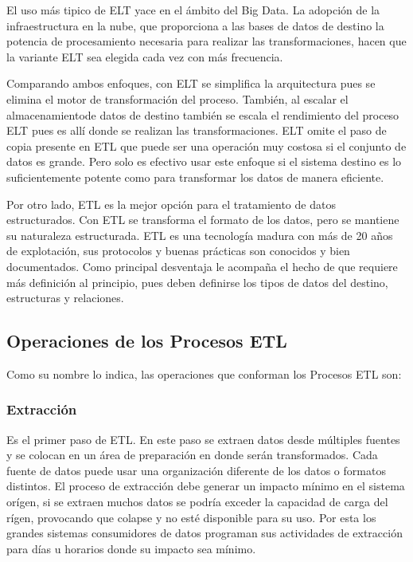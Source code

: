 El uso m\'as tipico de ELT yace en el \'ambito del Big Data\cite{raunakjhawar_ETL_microsoft}. La adopción de la 
infraestructura en la nube, que proporciona a las bases de datos de destino la potencia de procesamiento necesaria 
para realizar las transformaciones, hacen que la variante ELT sea elegida cada vez con m\'as frecuencia.

Comparando ambos enfoques, con ELT se simplifica la arquitectura pues se elimina el motor de transformación del proceso. 
Tambi\'en, al escalar el almacenamientode datos de destino también se escala el rendimiento del proceso ELT pues es all\'i
donde se realizan las transformaciones. ELT omite el paso de copia presente en ETL que puede ser una operaci\'on muy costosa 
si el conjunto de datos es grande. Pero solo es efectivo usar este enfoque si el sistema destino es lo suficientemente
potente como para transformar los datos de manera eficiente.

Por otro lado, ETL es la mejor opci\'on para el tratamiento de datos estructurados\cite{etl_vs_elt_amazon}. Con 
ETL se transforma el formato de los datos, pero se mantiene su naturaleza estructurada. ETL es una tecnología madura 
con m\'as de 20 años de explotaci\'on, sus protocolos y buenas pr\'acticas son conocidos y bien documentados. Como principal 
desventaja le acompaña el hecho de que requiere m\'as definici\'on al principio, pues deben definirse los tipos de datos 
del destino, estructuras y relaciones.

\subsection{Operaciones de los Procesos ETL}

Como su nombre lo indica, las operaciones que conforman los Procesos ETL son:

\subsubsection{Extracci\'on}

Es el primer paso de ETL. En este paso se extraen datos desde m\'ultiples fuentes y se colocan en un \'area de preparaci\'on 
en donde ser\'an transformados. Cada fuente de datos puede usar una organizaci\'on diferente de los datos o formatos distintos. 
El proceso de extracci\'on debe generar un impacto m\'inimo en el sistema or\'igen, si se extraen muchos datos se podr\'ia 
exceder la capacidad de carga del r\'igen, provocando que colapse y no est\'e disponible para su uso. Por esta los grandes 
sistemas consumidores de datos programan sus actividades de extracci\'on para d\'ias u horarios donde su impacto sea 
m\'inimo. 

